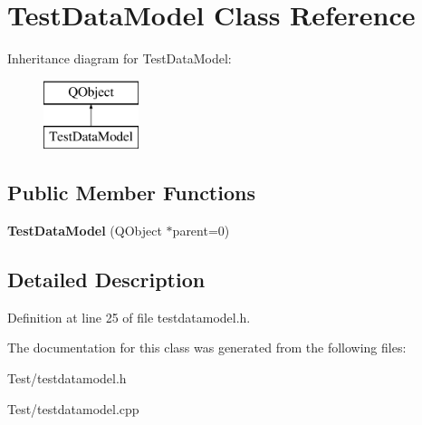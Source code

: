 \hypertarget{class_test_data_model}{}\section{Test\+Data\+Model Class Reference}
\label{class_test_data_model}
Inheritance diagram for Test\+Data\+Model\+:\begin{figure}[H]
\begin{center}
\leavevmode
\includegraphics[height=2.000000cm]{class_test_data_model}
\end{center}
\end{figure}
\subsection*{Public Member Functions}
\begin{DoxyCompactItemize}
\item 
{\bfseries Test\+Data\+Model} (Q\+Object $\ast$parent=0)\hypertarget{class_test_data_model_acc20bf4338cc133b34172c6b15352d1b}{}\label{class_test_data_model_acc20bf4338cc133b34172c6b15352d1b}

\end{DoxyCompactItemize}


\subsection{Detailed Description}


Definition at line 25 of file testdatamodel.\+h.



The documentation for this class was generated from the following files\+:\begin{DoxyCompactItemize}
\item 
Test/testdatamodel.\+h\item 
Test/testdatamodel.\+cpp\end{DoxyCompactItemize}
